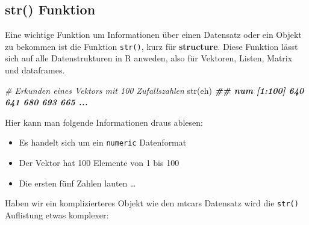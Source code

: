 \documentclass[
]{article}
\newenvironment{Shaded}{\begin{snugshade}}{\end{snugshade}}
\newcommand{\CommentTok}[1]{\textcolor[rgb]{0.56,0.35,0.01}{\textit{#1}}}
\newcommand{\DocumentationTok}[1]{\textcolor[rgb]{0.56,0.35,0.01}{\textbf{\textit{#1}}}}
\newcommand{\FunctionTok}[1]{\textcolor[rgb]{0.00,0.00,0.00}{#1}}
\newcommand{\NormalTok}[1]{#1}
\providecommand{\tightlist}{%
  \setlength{\itemsep}{0pt}\setlength{\parskip}{0pt}}
\begin{document}
\hypertarget{str-funktion}{%
\subsection{str() Funktion}\label{str-funktion}}

Eine wichtige Funktion um Informationen über einen Datensatz oder ein Objekt zu bekommen ist die Funktion \texttt{str()}, kurz für \textbf{structure}. Diese Funktion lässt sich auf alle Datenstrukturen in R anweden, also für Vektoren, Listen, Matrix und dataframes.

\begin{Shaded}
\begin{Highlighting}[]
\CommentTok{\# Erkunden eines Vektors mit 100 Zufallszahlen}
\FunctionTok{str}\NormalTok{(eh)}
\DocumentationTok{\#\#  num [1:100] 640 641 680 693 665 ...}
\end{Highlighting}
\end{Shaded}

Hier kann man folgende Informationen draus ablesen:

\begin{itemize}
\tightlist
\item
  Es handelt sich um ein \texttt{numeric} Datenformat
\item
  Der Vektor hat 100 Elemente von 1 bis 100
\item
  Die ersten fünf Zahlen lauten \ldots{}
\end{itemize}

Haben wir ein komplizierteres Objekt wie den mtcars Datensatz wird die \texttt{str()} Auflistung etwas komplexer:

\begin{Shaded}
\end{Shaded}
\end{document}
